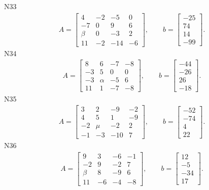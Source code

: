 \documentclass[11pt]{report}
\begin{document}
N33
\begin{align*}
 A = \left[\begin{matrix}4 & -2 & -5 & 0\\-7 & 0 & 9 & 6\\\beta & 0 & -3 & 2\\11 & -2 & -14 & -6\end{matrix}\right],
\qquad b = \left[\begin{matrix}-25\\74\\14\\-99\end{matrix}\right]. 
 \end{align*}
N34
\begin{align*}
 A = \left[\begin{matrix}8 & 6 & -7 & -8\\-3 & 5 & 0 & 0\\-3 & \alpha & -5 & 6\\11 & 1 & -7 & -8\end{matrix}\right],
\qquad b = \left[\begin{matrix}-44\\-26\\26\\-18\end{matrix}\right]. 
 \end{align*}
N35
\begin{align*}
 A = \left[\begin{matrix}3 & 2 & -9 & -2\\4 & 5 & 1 & -9\\-2 & \mu & -2 & 2\\-1 & -3 & -10 & 7\end{matrix}\right],
\qquad b = \left[\begin{matrix}-52\\-74\\4\\22\end{matrix}\right]. 
 \end{align*}
N36
\begin{align*}
 A = \left[\begin{matrix}9 & 3 & -6 & -1\\-2 & 9 & -2 & 7\\\beta & 8 & -9 & 6\\11 & -6 & -4 & -8\end{matrix}\right],
\qquad b = \left[\begin{matrix}12\\-5\\-34\\17\end{matrix}\right]. 
 \end{align*}
\end{document}
